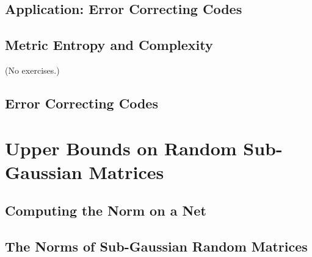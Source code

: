 \documentclass{report}
\theoremstyle{definition}
\newenvironment{exercise}[1]{
  \renewcommand\theexerciseimpl{#1}
  \exerciseimpl
}{\endexerciseimpl}
\begin{document}
\begin{exercise}{4.2.15}
\end{exercise}

\begin{exercise}{4.2.16}
\end{exercise}

\subsection{Application: Error Correcting Codes}

\subsection{Metric Entropy and Complexity}

(No exercises.)

\subsection{Error Correcting Codes}

\begin{exercise}{4.3.7}
\end{exercise}

\section{Upper Bounds on Random Sub-Gaussian Matrices}

\subsection{Computing the Norm on a Net}

\begin{exercise}{4.4.2}
\end{exercise}

\begin{exercise}{4.4.3}
\end{exercise}

\begin{exercise}{4.4.4}
\end{exercise}

\subsection{The Norms of Sub-Gaussian Random Matrices}

\begin{exercise}{4.4.6}
\end{exercise}
\end{document}
